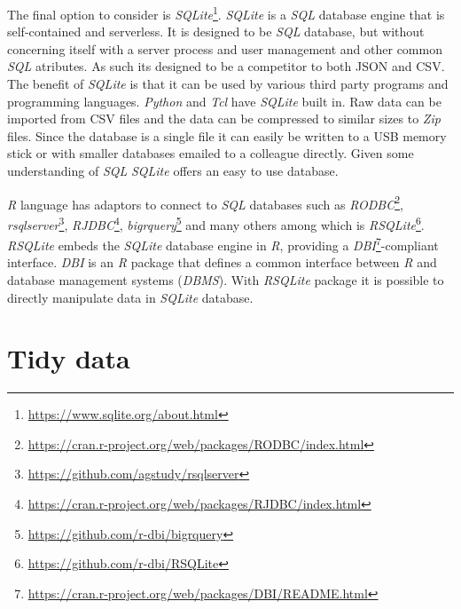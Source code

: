 \documentclass[12pt,oneside]{reedthesis}
\theoremstyle{definition}
\theoremstyle{definition}
\theoremstyle{definition}
\theoremstyle{remark}
\begin{document}
The final option to consider is \emph{SQLite}\footnote{\url{https://www.sqlite.org/about.html}}.
\emph{SQLite} is a \emph{SQL} database engine that is self-contained and
serverless. It is designed to be \emph{SQL} database, but without
concerning itself with a server process and user management and other
common \emph{SQL} atributes. As such its designed to be a competitor to
both JSON and CSV. The benefit of \emph{SQLite} is that it can be used
by various third party programs and programming languages. \emph{Python}
and \emph{Tcl} have \emph{SQLite} built in. Raw data can be imported
from CSV files and the data can be compressed to similar sizes to
\emph{Zip} files. Since the database is a single file it can easily be
written to a USB memory stick or with smaller databases emailed to a
colleague directly. Given some understanding of \emph{SQL} \emph{SQLite}
offers an easy to use database.

\emph{R} language has adaptors to connect to \emph{SQL} databases such
as \emph{RODBC}\footnote{\url{https://cran.r-project.org/web/packages/RODBC/index.html}},
\emph{rsqlserver}\footnote{\url{https://github.com/agstudy/rsqlserver}},
\emph{RJDBC}\footnote{\url{https://cran.r-project.org/web/packages/RJDBC/index.html}},
\emph{bigrquery}\footnote{\url{https://github.com/r-dbi/bigrquery}} and
many others among which is \emph{RSQLite}\footnote{\url{https://github.com/r-dbi/RSQLite}}.
\emph{RSQLite} embeds the \emph{SQLite} database engine in \emph{R},
providing a \emph{DBI}\footnote{\url{https://cran.r-project.org/web/packages/DBI/README.html}}-compliant
interface. \emph{DBI} is an \emph{R} package that defines a common
interface between \emph{R} and database management systems
(\emph{DBMS}). With \emph{RSQLite} package it is possible to directly
manipulate data in \emph{SQLite} database.

\section{Tidy data}\label{tidy-data}
\end{document}
